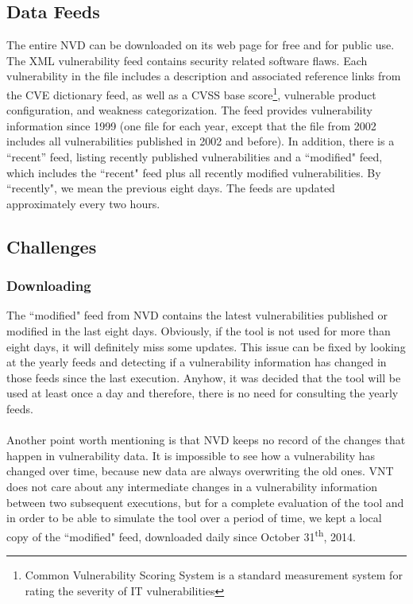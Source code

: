 \subsection{Data Feeds}
The entire NVD can be downloaded on its web page for free and for public use. The XML vulnerability feed contains security related software flaws. Each vulnerability in the file includes a description and associated reference links from the CVE dictionary feed, as well as a CVSS base score\footnote{Common Vulnerability Scoring System is a standard measurement system for rating the severity of IT vulnerabilities}, vulnerable product configuration, and weakness categorization. The feed provides vulnerability information since 1999 (one file for each year, except that the file from 2002 includes all vulnerabilities published in 2002 and before). In addition, there is a ``recent'' feed, listing recently published vulnerabilities and a ``modified" feed, which includes the ``recent" feed plus all recently modified vulnerabilities. By ``recently", we mean the previous eight days. The feeds are updated approximately every two hours.


\subsection{Challenges}
\subsubsection{Downloading}
The ``modified" feed from NVD contains the latest vulnerabilities published or modified in the last eight days. Obviously, if the tool is not used for more than eight days, it will definitely miss some updates. This issue can be fixed by looking at the yearly feeds and detecting if a vulnerability information has changed in those feeds since the last execution. Anyhow, it was decided that the tool will be used at least once a day and therefore, there is no need for consulting the yearly feeds. 
\paragraph{}
Another point worth mentioning is that NVD keeps no record of the changes that happen in vulnerability data. It is impossible to see how a vulnerability has changed over time, because new data are always overwriting the old ones. VNT does not care about any intermediate changes in a vulnerability information between two subsequent executions, but for a complete evaluation of the tool and in order to be able to simulate the tool over a period of time, we kept a local copy of the ``modified" feed, downloaded daily since October 31\textsuperscript{th}, 2014. 
